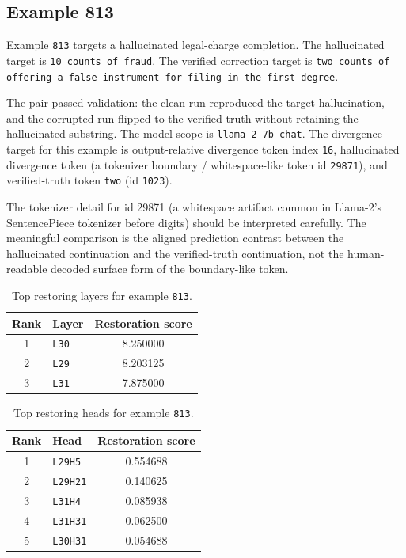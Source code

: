 \documentclass[11pt]{article}
\begin{document}
\subsection{Example 813}

Example \texttt{813} targets a hallucinated legal-charge completion. The hallucinated target is \texttt{10 counts of fraud}. The verified correction target is \texttt{two counts of offering a false instrument for filing in the first degree}.

The pair passed validation: the clean run reproduced the target hallucination, and the corrupted run flipped to the verified truth without retaining the hallucinated substring. The model scope is \texttt{llama-2-7b-chat}. The divergence target for this example is output-relative divergence token index \texttt{16}, hallucinated divergence token (a tokenizer boundary / whitespace-like token id \texttt{29871}), and verified-truth token \texttt{two} (id \texttt{1023}).

The tokenizer detail for id 29871 (a whitespace artifact common in Llama-2's SentencePiece tokenizer before digits) should be interpreted carefully. The meaningful comparison is the aligned prediction contrast between the hallucinated continuation and the verified-truth continuation, not the human-readable decoded surface form of the boundary-like token.

\begin{table}[t]
\caption{Top restoring layers for example \texttt{813}.}
\centering
\small
\begin{tabular}{clc}
\toprule
\textbf{Rank} & \textbf{Layer} & \textbf{Restoration score} \\
\midrule
1 & \texttt{L30} & 8.250000 \\
2 & \texttt{L29} & 8.203125 \\
3 & \texttt{L31} & 7.875000 \\
\bottomrule
\end{tabular}

\label{tab:813-layers}
\end{table}

\begin{table}[t]
\caption{Top restoring heads for example \texttt{813}.}
\centering
\small
\begin{tabular}{clc}
\toprule
\textbf{Rank} & \textbf{Head} & \textbf{Restoration score} \\
\midrule
1 & \texttt{L29H5} & 0.554688 \\
2 & \texttt{L29H21} & 0.140625 \\
3 & \texttt{L31H4} & 0.085938 \\
4 & \texttt{L31H31} & 0.062500 \\
5 & \texttt{L30H31} & 0.054688 \\
\bottomrule
\end{tabular}

\label{tab:813-heads}
\end{table}
\end{document}

